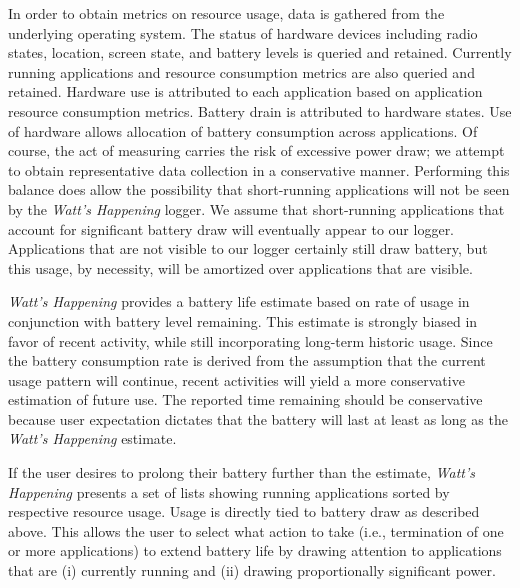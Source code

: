 In order to obtain metrics on resource usage, data is gathered from the underlying operating system.
The status of hardware devices including radio states, location, screen state, and battery levels is queried and retained.
Currently running applications and resource consumption metrics are also queried and retained. 
Hardware use is attributed to each application based on application resource consumption metrics. 
Battery drain is attributed to hardware states.
Use of hardware allows allocation of battery consumption across applications.
Of course, the act of measuring carries the risk of excessive power draw; we attempt to obtain representative data collection in a conservative manner.
Performing this balance does allow the possibility that short-running applications will not be seen by the \emph{Watt's Happening} logger.
We assume that short-running applications that account for significant battery draw will eventually appear to our logger.
Applications that are not visible to our logger certainly still draw battery, but this usage, by necessity, will be amortized over applications that are visible.

\emph{Watt's Happening} provides a battery life estimate based on rate of usage in conjunction with battery level remaining.
This estimate is strongly biased in favor of recent activity, while still incorporating long-term historic usage. 
Since the battery consumption rate is derived from the assumption that the current usage pattern will continue, recent activities will yield a more conservative estimation of future use.
The reported time remaining should be conservative because user expectation dictates that the battery will last at least as long as the \emph{Watt's Happening} estimate.


If the user desires to prolong their battery further than the estimate, \emph{Watt's Happening} presents a set of lists showing running applications sorted by respective resource usage.
Usage is directly tied to battery draw as described above. 
This allows the user to select what action to take (i.e., termination of one or more applications) to extend battery life by drawing attention to applications that are (i) currently running and (ii) drawing proportionally significant power.





